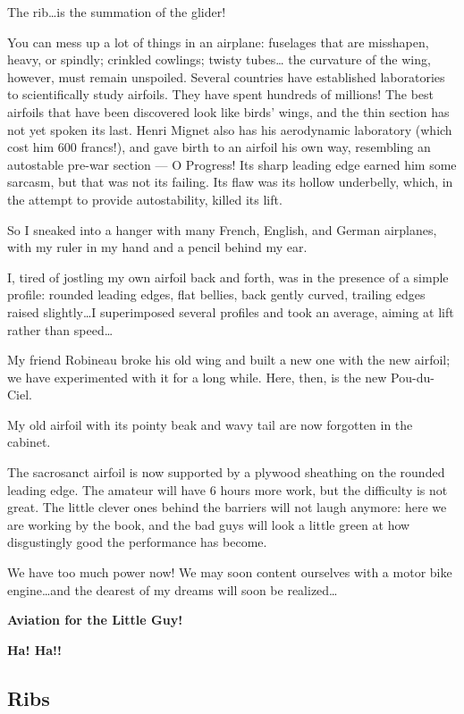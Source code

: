 \documentclass{book}
\begin{document}
The rib\ldots is the summation of the glider!

You can mess up a lot of things in an airplane: fuselages that are
misshapen, heavy, or spindly; crinkled cowlings; twisty tubes\ldots
the curvature of the wing, however, must remain unspoiled.  Several
countries have established laboratories to scientifically study
airfoils.  They have spent hundreds of millions!  The best airfoils
that have been discovered look like birds' wings, and the thin section
has not yet spoken its last.  Henri Mignet also has his aerodynamic
laboratory (which cost him 600 francs!), and gave birth to an airfoil
his own way, resembling an autostable pre-war section --- O Progress!
Its sharp leading edge earned him some sarcasm, but that was not its
failing.  Its flaw was its hollow underbelly, which, in the attempt to
provide autostability, killed its lift.

So I sneaked into a hanger with many French, English, and German
airplanes, with my ruler in my hand and a pencil behind my ear.

I, tired of jostling my own airfoil back and forth, was in the
presence of a simple profile: rounded leading edges, flat bellies,
back gently curved, trailing edges raised slightly\ldots I
superimposed several profiles and took an average, aiming at lift
rather than speed\ldots

My friend Robineau broke his old wing and built a new one with the new
airfoil; we have experimented with it for a long while.  Here, then,
is the new Pou-du-Ciel.

My old airfoil with its pointy beak and wavy tail are now forgotten in
the cabinet.

The sacrosanct airfoil is now supported by a plywood sheathing on the
rounded leading edge.  The amateur will have 6 hours more work, but
the difficulty is not great.  The little clever ones behind the
barriers will not laugh anymore: here we are working by the book, and
the bad guys will look a little green at how disgustingly good the
performance has become.

We have too much power now!  We may soon content ourselves with a
motor bike engine\ldots and the dearest of my dreams will soon be
realized\ldots

\begin{center}
  {\large \textbf{Aviation for the Little Guy!}
    
    \textbf{Ha! Ha!!}}
\end{center}

\subsection{Ribs}
\end{document}
